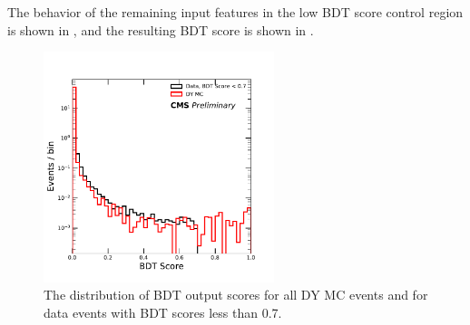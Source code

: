 The behavior of the remaining input features in the low BDT score control region is shown in , and the resulting BDT score is shown in .

\begin{figure}[htbp]
	\label{fig:BDTlowvalid}
	\centering
	\includegraphics[width=0.6\textwidth]{figures/partialBDTScore.pdf}
        \caption[Low BDT Score Validation]{The distribution of BDT output scores for all DY MC events and for data events with BDT scores less than 0.7.}
\end{figure}

